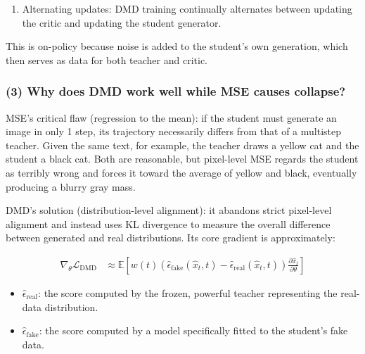 \begin{enumerate}
\def\labelenumi{\arabic{enumi}.}
\setcounter{enumi}{4}
\tightlist
\item
  Alternating updates: DMD training continually alternates between updating the critic and updating the student generator.
\end{enumerate}

This is on-policy because noise is added to the student's own generation, which then serves as data for both teacher and critic.

\hypertarget{why-does-dmd-work-well-while-mse-causes-collapse}{%
\subsubsection{(3) Why does DMD work well while MSE causes collapse?}\label{why-does-dmd-work-well-while-mse-causes-collapse}}

MSE's critical flaw (regression to the mean): if the student must generate an image in only 1 step, its trajectory necessarily differs from that of a multistep teacher. Given the same text, for example, the teacher draws a yellow cat and the student a black cat. Both are reasonable, but pixel-level MSE regards the student as terribly wrong and forces it toward the average of yellow and black, eventually producing a blurry gray mass.

DMD's solution (distribution-level alignment): it abandons strict pixel-level alignment and instead uses KL divergence to measure the overall difference between generated and real distributions. Its core gradient is approximately:

\[
\begin{aligned}
\nabla_\theta\mathcal{L}_{\mathrm{DMD}}
&\approx
\mathbb{E}\left[
w(t)
\left(\hat{\epsilon}_{\mathrm{fake}}(\hat{x}_t,t)-\hat{\epsilon}_{\mathrm{real}}(\hat{x}_t,t)\right)
\frac{\partial\hat{x}_t}{\partial\theta}
\right]
\end{aligned}
\]

\begin{itemize}
\tightlist
\item
  \(\hat{\epsilon}_{\mathrm{real}}\): the score computed by the frozen, powerful teacher representing the real-data distribution.
\item
  \(\hat{\epsilon}_{\mathrm{fake}}\): the score computed by a model specifically fitted to the student's fake data.
\end{itemize}

